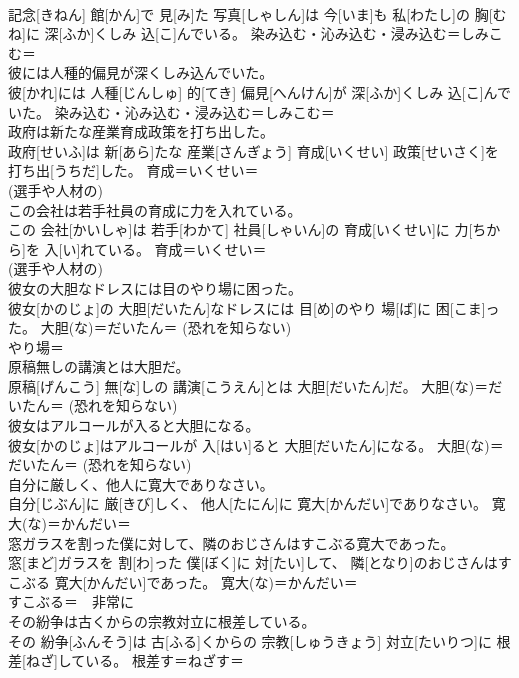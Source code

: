 \documentclass[8pt]{extreport}
\begin{document}
\begin{CJK}{UTF8}{min}
{\\	記念[きねん] 館[かん]で 見[み]た 写真[しゃしん]は 今[いま]も 私[わたし]の 胸[むね]に 深[ふか]くしみ 込[こ]んでいる。	染み込む・沁み込む・浸み込む＝しみこむ＝ 
\\	彼には人種的偏見が深くしみ込んでいた。	
\\	彼[かれ]には 人種[じんしゅ] 的[てき] 偏見[へんけん]が 深[ふか]くしみ 込[こ]んでいた。	染み込む・沁み込む・浸み込む＝しみこむ＝ 
\\	政府は新たな産業育成政策を打ち出した。	
\\	政府[せいふ]は 新[あら]たな 産業[さんぎょう] 育成[いくせい] 政策[せいさく]を 打ち出[うちだ]した。	育成＝いくせい＝ 
\\	(選手や人材の) 
\\	この会社は若手社員の育成に力を入れている。	
\\	この 会社[かいしゃ]は 若手[わかて] 社員[しゃいん]の 育成[いくせい]に 力[ちから]を 入[い]れている。	育成＝いくせい＝ 
\\	(選手や人材の) 
\\	彼女の大胆なドレスには目のやり場に困った。	
\\	彼女[かのじょ]の 大胆[だいたん]なドレスには 目[め]のやり 場[ば]に 困[こま]った。	大胆(な)＝だいたん＝ (恐れを知らない) 
\\	やり場＝ 
\\	原稿無しの講演とは大胆だ。	
\\	原稿[げんこう] 無[な]しの 講演[こうえん]とは 大胆[だいたん]だ。	大胆(な)＝だいたん＝ (恐れを知らない) 
\\	彼女はアルコールが入ると大胆になる。	
\\	彼女[かのじょ]はアルコールが 入[はい]ると 大胆[だいたん]になる。	大胆(な)＝だいたん＝ (恐れを知らない) 
\\	自分に厳しく、他人に寛大でありなさい。	
\\	自分[じぶん]に 厳[きび]しく、 他人[たにん]に 寛大[かんだい]でありなさい。	寛大(な)＝かんだい＝ 
\\	窓ガラスを割った僕に対して、隣のおじさんはすこぶる寛大であった。	
\\	窓[まど]ガラスを 割[わ]った 僕[ぼく]に 対[たい]して、 隣[となり]のおじさんはすこぶる 寛大[かんだい]であった。	寛大(な)＝かんだい＝ 
\\	すこぶる＝　非常に
\\	その紛争は古くからの宗教対立に根差している。	
\\	その 紛争[ふんそう]は 古[ふる]くからの 宗教[しゅうきょう] 対立[たいりつ]に 根差[ねざ]している。	根差す＝ねざす＝ 
}
\end{CJK}
\end{document}
